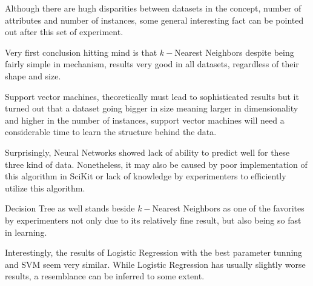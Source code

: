 Although there are hugh disparities between datasets in the concept, number of
attributes and number of instances, some general interesting fact can be pointed
out after this set of experiment.

Very first conclusion hitting mind is that $k-$Nearest Neighbors despite being
fairly simple in mechanism, results very good in all datasets, regardless of
their shape and size.

Support vector machines, theoretically must lead to sophisticated results but it
turned out that a dataset going bigger in size meaning larger in dimensionality
and higher in the number of instances, support vector machines will need a
considerable time to learn the structure behind the data.

Surprisingly, Neural Networks showed lack of ability to predict well for these
three kind of data. Nonetheless, it may also be caused by poor implementation of
this algorithm in SciKit or lack of knowledge by experimenters to efficiently
utilize this algorithm.

Decision Tree as well stands beside $k-$Nearest Neighbors as one of the
favorites by experimenters not only due to its relatively fine result, but also
being so fast in learning.

Interestingly, the results of Logistic Regression with the best parameter tunning and SVM seem very similar. While Logistic Regression has usually slightly worse results, a resemblance can be inferred to some extent.